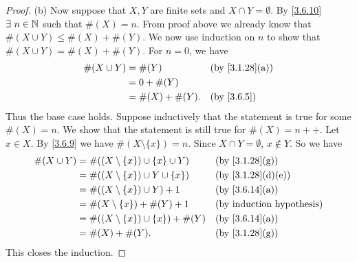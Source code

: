 \begin{proof}{(b)}
  Now suppose that \(X, Y\) are finite sets and \(X \cap Y = \emptyset\).
  By \cref{3.6.10} \(\exists\ n \in \N\) such that \(\#(X) = n\).
  From proof above we already know that \(\#(X \cup Y) \leq \#(X) + \#(Y)\).
  We now use induction on \(n\) to show that \(\#(X \cup Y) = \#(X) + \#(Y)\).
  For \(n = 0\), we have
  \begin{align*}
    \#(X \cup Y) & = \#(Y)          &  & \text{(by \cref{3.1.28}(a))} \\
                 & = 0 + \#(Y)                                        \\
                 & = \#(X) + \#(Y). &  & \by{3.6.5}
  \end{align*}
  Thus the base case holds.
  Suppose inductively that the statement is true for some \(\#(X) = n\).
  We show that the statement is still true for \(\#(X) = n++\).
  Let \(x \in X\).
  By \cref{3.6.9} we have \(\#(X \setminus \{x\}) = n\).
  Since \(X \cap Y = \emptyset\), \(x \notin Y\).
  So we have
  \begin{align*}
    \#(X \cup Y) & = \#((X \setminus \{x\}) \cup \{x\} \cup Y)  &  & \text{(by \cref{3.1.28}(g))}    \\
                 & = \#((X \setminus \{x\}) \cup Y \cup \{x\})  &  & \text{(by \cref{3.1.28}(d)(e))} \\
                 & = \#((X \setminus \{x\}) \cup Y) + 1         &  & \text{(by \cref{3.6.14}(a))}    \\
                 & = \#(X \setminus \{x\}) + \#(Y) + 1          &  & \byIH                           \\
                 & = \#((X \setminus \{x\}) \cup \{x\}) + \#(Y) &  & \text{(by \cref{3.6.14}(a))}    \\
                 & = \#(X) + \#(Y).                             &  & \text{(by \cref{3.1.28}(g))}
  \end{align*}
  This closes the induction.
\end{proof}

